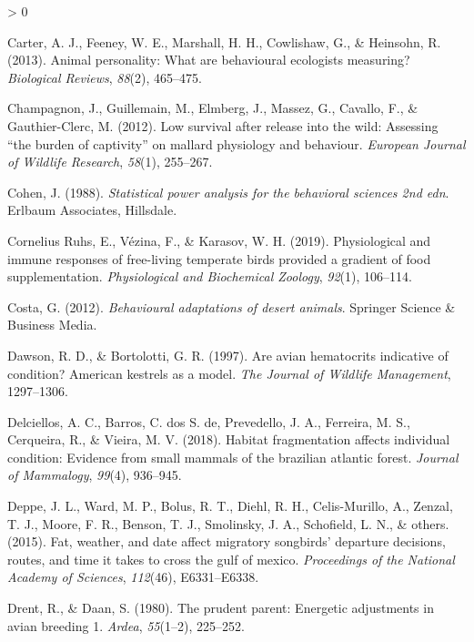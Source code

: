 \documentclass[
]{article}
\newlength{\cslhangindent}
\newenvironment{CSLReferences}[2] %
 {%
  \setlength{\parindent}{0pt}
  \ifodd #1 \everypar{\setlength{\hangindent}{\cslhangindent}}\ignorespaces\fi
  \ifnum #2 > 0
  \setlength{\parskip}{#2\baselineskip}
  \fi
 }%
 {}
\begin{document}
\begin{CSLReferences}{1}{0}
\leavevmode\hypertarget{ref-carter2013animal}{}%
Carter, A. J., Feeney, W. E., Marshall, H. H., Cowlishaw, G., \&
Heinsohn, R. (2013). Animal personality: What are behavioural ecologists
measuring? \emph{Biological Reviews}, \emph{88}(2), 465--475.

\leavevmode\hypertarget{ref-champagnon2012low}{}%
Champagnon, J., Guillemain, M., Elmberg, J., Massez, G., Cavallo, F., \&
Gauthier-Clerc, M. (2012). Low survival after release into the wild:
Assessing {``the burden of captivity''} on mallard physiology and
behaviour. \emph{European Journal of Wildlife Research}, \emph{58}(1),
255--267.

\leavevmode\hypertarget{ref-cohen1988statistical}{}%
Cohen, J. (1988). \emph{Statistical power analysis for the behavioral
sciences 2nd edn}. Erlbaum Associates, Hillsdale.

\leavevmode\hypertarget{ref-cornelius2019physiological}{}%
Cornelius Ruhs, E., Vézina, F., \& Karasov, W. H. (2019). Physiological
and immune responses of free-living temperate birds provided a gradient
of food supplementation. \emph{Physiological and Biochemical Zoology},
\emph{92}(1), 106--114.

\leavevmode\hypertarget{ref-costa2012behavioural}{}%
Costa, G. (2012). \emph{Behavioural adaptations of desert animals}.
Springer Science \& Business Media.

\leavevmode\hypertarget{ref-dawson1997avian}{}%
Dawson, R. D., \& Bortolotti, G. R. (1997). Are avian hematocrits
indicative of condition? American kestrels as a model. \emph{The Journal
of Wildlife Management}, 1297--1306.

\leavevmode\hypertarget{ref-delciellos2018habitat}{}%
Delciellos, A. C., Barros, C. dos S. de, Prevedello, J. A., Ferreira, M.
S., Cerqueira, R., \& Vieira, M. V. (2018). Habitat fragmentation
affects individual condition: Evidence from small mammals of the
brazilian atlantic forest. \emph{Journal of Mammalogy}, \emph{99}(4),
936--945.

\leavevmode\hypertarget{ref-deppe2015fat}{}%
Deppe, J. L., Ward, M. P., Bolus, R. T., Diehl, R. H., Celis-Murillo,
A., Zenzal, T. J., Moore, F. R., Benson, T. J., Smolinsky, J. A.,
Schofield, L. N., \& others. (2015). Fat, weather, and date affect
migratory songbirds' departure decisions, routes, and time it takes to
cross the gulf of mexico. \emph{Proceedings of the National Academy of
Sciences}, \emph{112}(46), E6331--E6338.

\leavevmode\hypertarget{ref-drent1980prudent}{}%
Drent, R., \& Daan, S. (1980). The prudent parent: Energetic adjustments
in avian breeding 1. \emph{Ardea}, \emph{55}(1--2), 225--252.


\end{CSLReferences}
\end{document}
